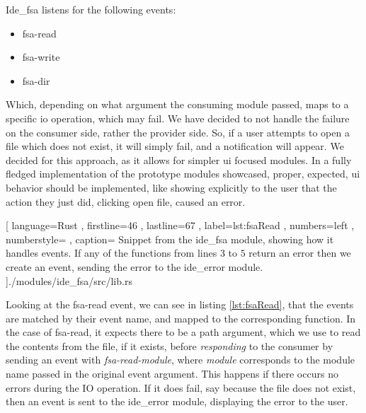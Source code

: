 Ide\_fsa listens for the following events:

\begin{itemize}
  \item fsa-read
  \item fsa-write
  \item fsa-dir
\end{itemize}

Which, depending on what argument the consuming module passed, maps to a
specific \gls*{io} operation, which may fail. We have decided to not handle the
failure on the consumer side, rather the provider side. So, if a user attempts
to open a file which does not exist, it will simply fail, and a notification
will appear. We decided for this approach, as it allows for simpler \gls*{ui}
focused modules. In a fully fledged implementation of the prototype modules
showcased, proper, expected, \gls*{ui} behavior should be implemented, like
showing explicitly to the user that the action they just did, clicking open
file, caused an error.

\begin{code}[H]
  
    [ language=Rust
    , firstline=46
    , lastline=67
    , label=lst:fsaRead
    , numbers=left
    , numberstyle=\tiny\color{gray}
    , caption={
      Snippet from the ide\_fsa module, showing how it handles events. If any of
      the functions from lines $3$ to $5$ return an error then we create an event,
      sending the error to the ide\_error module.
    }
    ]{./modules/ide\_fsa/src/lib.rs}
\end{code}

Looking at the fsa-read event, we can see in listing \ref{lst:fsaRead}, that the
events are matched by their event name, and mapped to the corresponding function.
In the case of fsa-read, it expects there to be a path argument, which we use to
read the contents from the file, if it exists, before \textit{responding} to the
consumer by sending an event with \textit{fsa-read-module}, where
\textit{module} corresponds to the module name passed in the original event
argument. This happens if there occurs no errors\footnotemark{} during the IO
operation. If it does fail, say because the file does not exist, then an event
is sent to the ide\_error module, displaying the error to the user.

